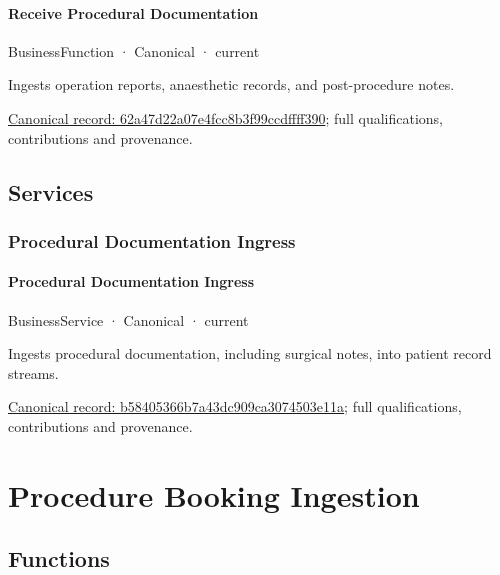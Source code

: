 \paragraph{Receive Procedural Documentation}

\label{element:62a47d22a07e4fcc8b3f99ccdffff390}
{\small BusinessFunction · Canonical · current}\par

Ingests operation reports, anaesthetic records, and post-procedure notes.


{\footnotesize \href{../../../../continuum/business/business-function/62a47d22a07e4fcc8b3f99ccdffff390.md}{Canonical record: 62a47d22a07e4fcc8b3f99ccdffff390}; full qualifications, contributions and provenance.}\par
\subsection{Services}

\subsubsection{Procedural Documentation Ingress}

\paragraph{Procedural Documentation Ingress}

\label{element:b58405366b7a43dc909ca3074503e11a}
{\small BusinessService · Canonical · current}\par

Ingests procedural documentation, including surgical notes, into patient record streams.


{\footnotesize \href{../../../../continuum/business/business-service/b58405366b7a43dc909ca3074503e11a.md}{Canonical record: b58405366b7a43dc909ca3074503e11a}; full qualifications, contributions and provenance.}\par
\section{Procedure Booking Ingestion}

\subsection{Functions}

